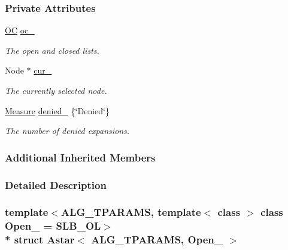 \subsubsection*{Private Attributes}
\begin{DoxyCompactItemize}
\item 
\hyperlink{structAstar_ad95c7f756780188272cd6e3c11e126de}{OC} \hyperlink{structAstar_a02b861c832a0388071fa748c3d5a2d4f}{oc\+\_\+}\hypertarget{structAstar_a02b861c832a0388071fa748c3d5a2d4f}{}\label{structAstar_a02b861c832a0388071fa748c3d5a2d4f}

\begin{DoxyCompactList}\small\item\em The open and closed lists. \end{DoxyCompactList}\item 
Node $\ast$ \hyperlink{structAstar_a75e08832a63c22763939540e76564be4}{cur\+\_\+}\hypertarget{structAstar_a75e08832a63c22763939540e76564be4}{}\label{structAstar_a75e08832a63c22763939540e76564be4}

\begin{DoxyCompactList}\small\item\em The currently selected node. \end{DoxyCompactList}\item 
\hyperlink{structMeasure}{Measure} \hyperlink{structAstar_ae0548c7f955d9d386e2d39078e88b16d}{denied\+\_\+} \{\char`\"{}Denied\char`\"{}\}\hypertarget{structAstar_ae0548c7f955d9d386e2d39078e88b16d}{}\label{structAstar_ae0548c7f955d9d386e2d39078e88b16d}

\begin{DoxyCompactList}\small\item\em The number of denied expansions. \end{DoxyCompactList}\end{DoxyCompactItemize}
\subsubsection*{Additional Inherited Members}


\subsubsection{Detailed Description}
\subsubsection*{template$<$A\+L\+G\+\_\+\+T\+P\+A\+R\+A\+MS, template$<$ class $>$ class Open\+\_\+ = S\+L\+B\+\_\+\+OL$>$\\*
struct Astar$<$ A\+L\+G\+\_\+\+T\+P\+A\+R\+A\+M\+S, Open\+\_\+ $>$}

